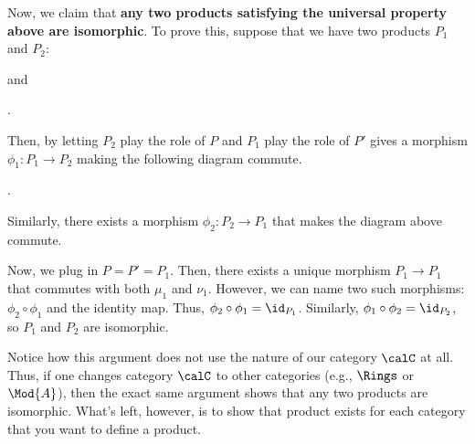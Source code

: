 Now, we claim that \textbf{any two products satisfying
the universal property above are isomorphic}.
To prove this, suppose that we have two products $P_1$ and $P_2$:
\begin{center}
\quad and\quad
{}.
\end{center}
Then, by letting $P_2$ play the role of $P$
and $P_1$ play the role of $P'$ gives a morphism 
$\phi_1 : P_1\to P_2$ making the following diagram commute.
\begin{center}
.
\end{center}
Similarly, there exists a morphism $\phi_2 : P_2\to P_1$
that makes the diagram above commute.

Now, we plug in $P=P'=P_1$. 
Then, there exists a unique morphism $P_1\to P_1$ 
that commutes with both $\mu_1$ and $\nu_1$.
However, we can name two such morphisms:
$\phi_2\circ\phi_1$ and the identity map.
Thus, $\phi_2\circ\phi_1 = \id_{P_1}$.
Similarly, $\phi_1\circ\phi_2 = \id_{P_2}$,
so $P_1$ and $P_2$ are isomorphic.

Notice how this argument does not use 
the nature of our category $\calC$ at all.
Thus, if one changes category $\calC$ to other categories
(e.g., $\Rings$ or $\Mod{A}$), then 
the exact same argument shows that any two products are isomorphic.
What's left, however, is to show that product
exists for each category that you want to define a product.

